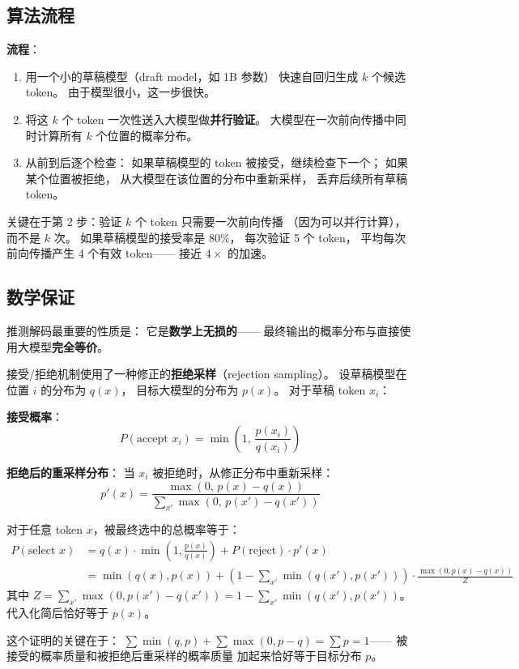 \subsection{算法流程}

\textbf{流程}：
\begin{enumerate}[noitemsep]
  \item 用一个小的草稿模型（draft model，如 1B 参数）
        快速自回归生成 $k$ 个候选 token。
        由于模型很小，这一步很快。
  \item 将这 $k$ 个 token 一次性送入大模型做\textbf{并行验证}。
        大模型在一次前向传播中同时计算所有 $k$ 个位置的概率分布。
  \item 从前到后逐个检查：
        如果草稿模型的 token 被接受，继续检查下一个；
        如果某个位置被拒绝，
        从大模型在该位置的分布中重新采样，
        丢弃后续所有草稿 token。
\end{enumerate}

关键在于第 2 步：验证 $k$ 个 token 只需要一次前向传播
（因为可以并行计算），而不是 $k$ 次。
如果草稿模型的接受率是 80\%，
每次验证 5 个 token，
平均每次前向传播产生 4 个有效 token——
接近 $4\times$ 的加速。

\subsection{数学保证}

推测解码最重要的性质是：
它是\textbf{数学上无损的}——
最终输出的概率分布与直接使用大模型\textbf{完全等价}。

接受/拒绝机制使用了一种修正的\textbf{拒绝采样}（rejection sampling）。
设草稿模型在位置 $i$ 的分布为 $q(x)$，
目标大模型的分布为 $p(x)$。
对于草稿 token $x_i$：

\textbf{接受概率}：
\begin{equation}
  P(\text{accept } x_i) = \min\!\left(1,\, \frac{p(x_i)}{q(x_i)}\right)
\end{equation}

\textbf{拒绝后的重采样分布}：
当 $x_i$ 被拒绝时，从修正分布中重新采样：
\begin{equation}
  p'(x) = \frac{\max(0,\, p(x) - q(x))}{\sum_{x'} \max(0,\, p(x') - q(x'))}
\end{equation}

\begin{whybox}[为什么这个过程保证输出分布不变？]
对于任意 token $x$，被最终选中的总概率等于：
\begin{align}
  P(\text{select } x) &= q(x) \cdot \min\!\left(1, \frac{p(x)}{q(x)}\right) + P(\text{reject}) \cdot p'(x) \\
  &= \min(q(x), p(x)) + \left(1 - \sum_{x'} \min(q(x'), p(x'))\right) \cdot \frac{\max(0, p(x) - q(x))}{Z}
\end{align}
其中 $Z = \sum_{x'} \max(0, p(x') - q(x')) = 1 - \sum_{x'} \min(q(x'), p(x'))$。
代入化简后恰好等于 $p(x)$。

这个证明的关键在于：
$\sum \min(q, p) + \sum \max(0, p-q) = \sum p = 1$——
被接受的概率质量和被拒绝后重采样的概率质量
加起来恰好等于目标分布 $p$。
\end{whybox}

